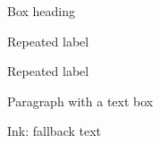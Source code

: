 \documentclass[11pt,a4paper]{article}
\begin{document}
Box heading

Repeated label

Repeated label

\begin{figure}[h]
\end{figure}

Paragraph with a text box

Ink: fallback text
\end{document}
